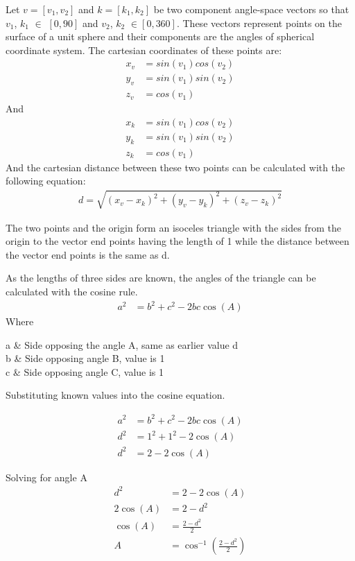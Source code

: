 \noindent Let $v= [v_1, v_2]$ and $k = [k_1, k_2]$ be two component angle-space vectors so that $v_1$, $k_1$ $\in$ $[0,90]$ and $v_2$, $k_2$ $\in [0,360]$. These vectors represent points on the surface of a unit sphere and their components are the angles of spherical coordinate system. The cartesian coordinates of these points are:
	\begin{align}
	x_v &= sin(v_1)cos(v_2)\\
	y_v &= sin(v_1)sin(v_2)\\
	z_v &= cos(v_1)
  \end{align}
  And
  \begin{align}
	x_k &= sin(v_1)cos(v_2)\\
	y_k &= sin(v_1)sin(v_2)\\
	z_k &= cos(v_1)
  \end{align}
\noindent And the cartesian distance between these two points can be calculated with the following equation:
\begin{align}
	d = \sqrt{(x_v-x_k)^2 + (y_v-y_k)^2+(z_v-z_k)^2}
\end{align}


\noindent The two points and the origin form an isoceles triangle with the sides from the origin to the vector end points having the length of 1 while the distance between the vector end points is the same as d.

\noindent As the lengths of three sides are known, the angles of the triangle can be calculated with the cosine rule. 
\begin{align}
	a^2 &= b^2 + c^2 - 2bc \cos(A)
\end{align}
Where
\begin{conditions}
 a     &  Side opposing the angle A, same as earlier value d \\
 b     &  Side opposing angle B, value is 1  \\   
 c	   &  Side opposing angle C, value is 1
\end{conditions}
\noindent Substituting known values into the cosine equation.

\begin{align}
	a^2 &= b^2 + c^2 - 2bc \cos(A)\\
	d^2 &= 1^2 + 1^2 - 2 \cos(A) \\
	d^2 &= 2 - 2 \cos(A)
\end{align}

\noindent Solving for angle A
\begin{align}
	d^2 &= 2-2\cos(A)\\
	2 \cos(A) &= 2 -d^2 \\
	\cos(A) &= \frac{2-d^2}{2} \\
	A &= \cos^{-1}(\frac{2-d^2}{2})
\end{align}


